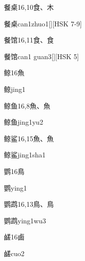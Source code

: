 \begin{Entry}{餐桌}{16,10}{⾷、⽊}
  \begin{Phonetics}{餐桌}{can1zhuo1}[][HSK 7-9]
  \end{Phonetics}
\end{Entry}

\begin{Entry}{餐馆}{16,11}{⾷、⾷}
  \begin{Phonetics}{餐馆}{can1 guan3}[][HSK 5]
  \end{Phonetics}
\end{Entry}

\begin{Entry}{鲸}{16}{⿂}
  \begin{Phonetics}{鲸}{jing1}
  \end{Phonetics}
\end{Entry}

\begin{Entry}{鲸鱼}{16,8}{⿂、⿂}
  \begin{Phonetics}{鲸鱼}{jing1yu2}
  \end{Phonetics}
\end{Entry}

\begin{Entry}{鲸鲨}{16,15}{⿂、⿂}
  \begin{Phonetics}{鲸鲨}{jing1sha1}
  \end{Phonetics}
\end{Entry}

\begin{Entry}{鹦}{16}{⿃}
  \begin{Phonetics}{鹦}{ying1}
  \end{Phonetics}
\end{Entry}

\begin{Entry}{鹦鹉}{16,13}{⿃、⿃}
  \begin{Phonetics}{鹦鹉}{ying1wu3}
  \end{Phonetics}
\end{Entry}

\begin{Entry}{鹾}{16}{⿄}
  \begin{Phonetics}{鹾}{cuo2}
  \end{Phonetics}
\end{Entry}


